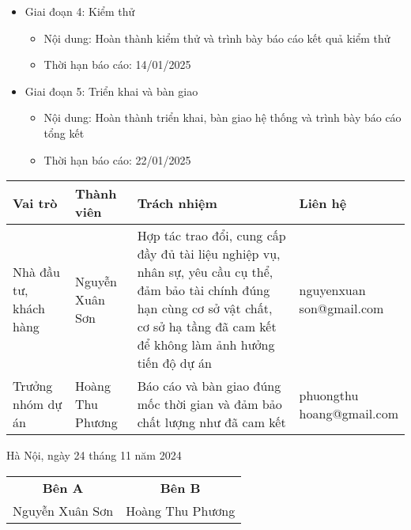 {\begin{minipage}{\textwidth}
\begin{itemize}
\begin{itemize}
\begin{itemize}
                    \begin{itemize}
                        \item Nội dung: Hoàn thành phát triển phần mềm và trình bày báo cáo tiến độ xây dựng
                        \item Thời hạn báo cáo: 07/12/2024
                    \end{itemize}
                    \item Giai đoạn 4: Kiểm thử
                    \begin{itemize}
                        \item Nội dung: Hoàn thành kiểm thử và trình bày báo cáo kết quả kiểm thử
                        \item Thời hạn báo cáo: 14/01/2025
                    \end{itemize}
                    \item Giai đoạn 5: Triển khai và bàn giao
                    \begin{itemize}
                        \item Nội dung: Hoàn thành triển khai, bàn giao hệ thống và trình bày báo cáo tổng kết
                        \item Thời hạn báo cáo: 22/01/2025
                    \end{itemize}
                \end{itemize}
            \end{itemize}
        \end{itemize}
        \centering
        \renewcommand{\arraystretch}{1.5} %
        \begin{tabular}{|p{2cm}|p{3cm}|p{6cm}|p{2.8cm}|}
            \hline
            \textbf{Vai trò} & \textbf{Thành viên} & \textbf{Trách nhiệm} & \textbf{Liên hệ} \\
            \hline
            Nhà đầu tư, khách hàng & Nguyễn Xuân Sơn & Hợp tác trao đổi, cung cấp đầy đủ tài liệu nghiệp vụ, nhân sự, yêu cầu cụ thể, đảm bảo tài chính đúng hạn cùng cơ sở vật chất, cơ sở hạ tầng đã cam kết để không làm ảnh hưởng tiến độ dự án &   \parbox[t]{4cm}{nguyenxuan\\son@gmail.com} \\
            \hline
            Trưởng nhóm dự án & Hoàng Thu Phương & Báo cáo và bàn giao đúng mốc thời gian và đảm bảo chất lượng như đã cam kết & \parbox[t]{4cm}{phuongthu\\hoang@gmail.com} \\
            \hline
        \end{tabular}
        \begin{center}
        Hà Nội, ngày 24 tháng 11 năm 2024 \\[0.5cm]
        \begin{tabular}{c c}
            \textbf{Bên A} & \textbf{Bên B} \\
            Nguyễn Xuân Sơn & Hoàng Thu Phương \\
        \end{tabular}
        \end{center}
    \end{minipage}
}
